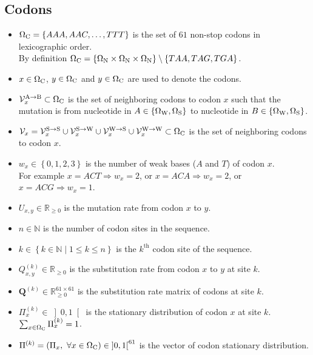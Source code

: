 \subsection{Codons}
\begin{itemize}
	\item $\Omega_{\mathrm{C}} = \left\{ AAA,AAC, \dots, TTT \right\} $ is the set of $61$ non-stop \glspl{codon} in lexicographic order.
	\\By definition $\Omega_{\mathrm{C}} = \left\{ \Omega_{\mathrm{N}} \times \Omega_{\mathrm{N}} \times \Omega_{\mathrm{N}} \right\} \setminus \left\{ TAA, TAG, TGA \right\} $.
	\item $x \in \Omega_{\mathrm{C}} $, $y \in \Omega_{\mathrm{C}} $ and $y \in \Omega_{\mathrm{C}} $ are used to denote the \glspl{codon}.
	\item $\mathcal{V}_x^{\mathrm{A} \rightarrow \mathrm{B}} \subset \Omega_{\mathrm{C}} $ is the set of neighboring \glspl{codon} to \gls{codon} $x$ such that the mutation is from nucleotide in $A \in \left\{ \Omega_{\mathrm{W}}, \Omega_{\mathrm{S}} \right\}$ to nucleotide in $B \in \left\{ \Omega_{\mathrm{W}}, \Omega_{\mathrm{S}} \right\}$.
	\item $\mathcal{V}_x =  \mathcal{V}_x^{\mathrm{S} \rightarrow \mathrm{S}} \cup \mathcal{V}_x^{\mathrm{S} \rightarrow \mathrm{W}} \cup \mathcal{V}_x^{\mathrm{W} \rightarrow \mathrm{S}} \cup \mathcal{V}_x^{\mathrm{W} \rightarrow \mathrm{W}} \subset \Omega_{\mathrm{C}} $ is the set of neighboring \glspl{codon} to \gls{codon} $x$.
	\item $w_x \in \left\{0,1,2,3 \right\}$ is the number of weak bases ($A$ and $T$) of \gls{codon} $x$.
	\\For example $x=ACT \Rightarrow w_x=2$, or  $x=ACA \Rightarrow w_x=2$, or $x=ACG \Rightarrow w_x=1$.
	\item $U_{x,y} \in \mathbb{R}_{\geq 0} $ is the mutation rate from \gls{codon} $x$ to $y$.
	\item $n \in \mathbb{N}$ is the number of \gls{codon} sites in the sequence.
	\item $k \in \left\{ k \in \mathbb{N} \mid 1 \leq k \leq n \right\}$ is the $k^{\mathrm{th}}$ \gls{codon} site of the sequence.
	\item $Q_{x,y}^{(k)} \in \mathbb{R}_{\geq 0} $ is the \gls{substitution} rate from \gls{codon} $x$ to $y$ at site $k$.
	\item $\bm{Q}^{(k)} \in \mathbb{R}_{\geq 0}^{61 \times 61} $ is the \gls{substitution} rate matrix of \glspl{codon} at site $k$.
	\item $\Pi_x^{(k)} \in \left]0,1\right[ $ is the stationary distribution of \gls{codon} $x$ at site $k$. $\sum_{x \in \Omega_{\mathrm{C}}} \Pi_x^{(k)} = 1$.
	\item $\Pi^{(k)} = \left( \Pi_x , \ \forall x \in \Omega_{\mathrm{C}} \right) \in \left]0,1\right[^{61} $ is the vector of \gls{codon} stationary distribution.
\end{itemize}

